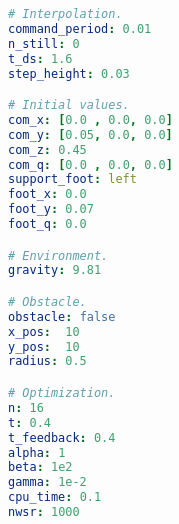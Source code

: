 \begin{minipage}[t]{1.\textwidth}
\begin{minipage}{0.5\textwidth}
\begin{lstlisting}[language=yaml]
# Interpolation.
command_period: 0.01
n_still: 0
t_ds: 1.6
step_height: 0.03

# Initial values.
com_x: [0.0 , 0.0, 0.0]
com_y: [0.05, 0.0, 0.0]
com_z: 0.45
com_q: [0.0 , 0.0, 0.0]
support_foot: left
foot_x: 0.0
foot_y: 0.07
foot_q: 0.0

# Environment.
gravity: 9.81

# Obstacle.
obstacle: false
x_pos:  10
y_pos:  10
radius: 0.5

# Optimization.
n: 16
t: 0.4
t_feedback: 0.4
alpha: 1
beta: 1e2
gamma: 1e-2
cpu_time: 0.1
nwsr: 1000
		\end{lstlisting}
	\end{minipage}
\end{minipage}
\\
